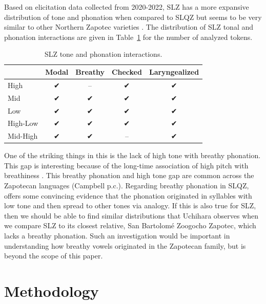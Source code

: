 \documentclass[12pt, letterpaper]{article}
\providecommand{\lsptoprule}{\midrule\toprule}
\providecommand{\lspbottomrule}{\bottomrule\midrule}
\begin{document}
Based on elicitation data collected from 2020-2022, SLZ has a more expansive distribution of tone and phonation when compared to SLQZ but seems to be very similar to other Northern Zapotec varieties \citep[e.g.,][]{avelinobecerraTopicsYalalagZapotec2004}. The distribution of SLZ tonal and phonation interactions are given in Table~\ref{tab:ToneVoiceQuality} for the number of analyzed tokens. 
\begin{table}[!h]
	\caption{SLZ tone and phonation interactions.}
	\label{tab:ToneVoiceQuality}
	\centering

	\begin{tabular}{lcccc}
	\lsptoprule
		& \textbf{Modal} & \textbf{Breathy} & \textbf{Checked} & \textbf{Laryngealized} \\
	\hline
	High		& ✔︎ & -- & ✔︎ & ✔︎ \\
	Mid			& ✔︎ & ✔︎ & ✔︎ & ✔︎ \\
	Low			& ✔︎ & ✔︎ & ✔︎ & ✔︎ \\
	High-Low	& ✔︎ & ✔︎ & ✔︎ & ✔︎ \\
	Mid-High	& ✔︎	& ✔︎ & -- & ✔︎ \\
	\lspbottomrule
	\end{tabular}
\end{table}

One of the striking things in this is the lack of high tone with breathy phonation. This gap is interesting because of the long-time association of high pitch with breathiness \citep[a good overview–of this association and other phonation types–is found in][]{eslingVoiceQualityLaryngeal2019}. This breathy phonation and high tone gap are common across the Zapotecan languages (Campbell p.c.). Regarding breathy phonation in SLQZ, \citet{uchiharaToneRegistrogenesisQuiavini2016} offers some convincing evidence that the phonation originated in syllables with low tone and then spread to other tones via analogy. If this is also true for SLZ, then we should be able to find similar distributions that Uchihara observes when we compare SLZ to its closest relative, San Bartolomé Zoogocho Zapotec, which lacks a breathy phonation. Such an investigation would be important in understanding how breathy vowels originated in the Zapotecan family, but is beyond the scope of this paper.  

 

\section{Methodology} \label{sec:Methods}
\end{document}
